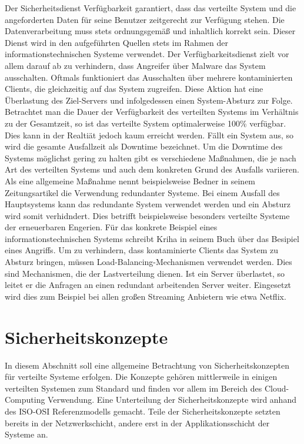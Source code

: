 \documentclass[utf8,biblatex]{lni}
\begin{document}
Der Sicherheitsdienst Verfügbarkeit garantiert, dass das verteilte System und die angeforderten Daten für seine Benutzer zeitgerecht zur Verfügung stehen. Die Datenverarbeitung muss stets ordnungsgemäß
und inhaltlich korrekt sein. \cite{Bedner.2010}
Dieser Dienst wird in den aufgeführten Quellen stets im Rahmen der informationstechnischen Systeme verwendet. Der Verfügbarkeitsdienst
  zielt vor allem darauf ab zu verhindern, 
dass Angreifer über Malware das System ausschalten. Oftmals funktioniert das Ausschalten über mehrere kontaminierten Clients, die gleichzeitig auf das System zugreifen. 
Diese Aktion hat eine Überlastung des Ziel-Servers und infolgedessen einen System-Absturz zur Folge. \cite{Kriha.2008}
\newline
Betrachtet man die Dauer der Verfügbarkeit des verteilten Systems im Verhältnis zu der Gesamtzeit, so ist das verteilte System optimalerweise 100\% verfügbar. Dies kann in der Realtiät jedoch kaum erreicht werden.
Fällt ein System aus, so wird die gesamte Ausfallzeit als Downtime bezeichnet. \cite{Bedner.2010}
\newline
 Um die Downtime des Systems möglichst gering zu halten gibt es verschiedene Maßnahmen, die je nach Art des verteilten Systems und auch
dem konkreten Grund des Ausfalls variieren. Als eine allgemeine Maßnahme nennt beispielsweise Bedner in seinem Zeitungsartikel \cite{Bedner.2010} die Verwendung redundanter Systeme. Bei einem Ausfall
des Hauptsystems kann das redundante System verwendet werden und ein Absturz wird somit verhidndert. Dies betrifft beispielsweise besonders verteilte Systeme der erneuerbaren Engerien.
Für das konkrete Beispiel eines informationstechnischen Systems schreibt Kriha in seinem Buch \cite{Kriha.2008} über das Besipiel eines Angriffs. Um zu verhindern, dass kontaminierte Clients das System zu Absturz
bringen, müssen Load-Balancing-Mechanismen verwendet werden. Dies sind Mechanismen, die der Lastverteilung dienen. Ist ein Server überlastet, so leitet er die Anfragen an einen redundant arbeitenden Server weiter.
Eingesetzt wird dies zum Beispiel bei allen großen Streaming Anbietern wie etwa Netflix.

\section{Sicherheitskonzepte}

In diesem Abschnitt soll eine allgemeine Betrachtung von Sicherheitskonzepten 
für verteilte Systeme erfolgen. 
Die Konzepte gehören mittlerweile in einigen verteilten Systemen zum Standard und finden vor allem im Bereich des Cloud-Computing Verwendung.
Eine Unterteilung der Sicherheitskonzepte wird anhand des ISO-OSI Referenzmodells gemacht. 
Teile der Sicherheitskonzepte setzten bereits in der Netzwerkschicht, andere erst in der 
Applikationsschicht der Systeme an. 
\end{document}
